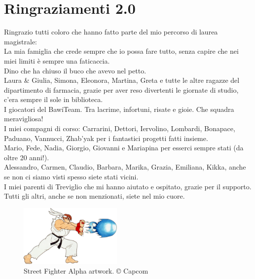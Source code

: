 %
%

\chapter*{Ringraziamenti 2.0}

Ringrazio tutti coloro che hanno fatto parte del mio percorso di laurea magistrale:\\
La mia famiglia che crede sempre che io possa fare tutto, senza capire che nei miei limiti è sempre una faticaccia.\\
Dino che ha chiuso il buco che avevo nel petto.\\
Laura \& Giulia, Simona, Eleonora, Martina, Greta e tutte le altre ragazze del dipartimento di farmacia, grazie per aver reso divertenti le giornate di studio, c'era sempre il sole in biblioteca.\\
I giocatori del BawiTeam. Tra lacrime, infortuni, risate e gioie. Che squadra meravigliosa!\\
I miei compagni di corso: Carrarini, Dettori, Iervolino, Lombardi, Bonapace, Paduano, Vannucci, Zhab'yak per i fantastici progetti fatti insieme.\\
Mario, Fede, Nadia, Giorgio, Giovanni e Mariapina per esserci sempre stati (da oltre 20 anni!).\\
Alessandro, Carmen, Claudio, Barbara, Marika, Grazia, Emiliana, Kikka, anche se non ci siamo visti spesso siete stati vicini.\\
I miei parenti di Treviglio che mi hanno aiutato e ospitato, grazie per il supporto.\\
Tutti gli altri, anche se non menzionati, siete nel mio cuore.

\vspace*{\fill}

\begin{figure}[H]
	\centering
	\includegraphics[width=5cm]{immagini/hadoken}
	\caption{Street Fighter Alpha artwork. © Capcom}
	\label{fig:hadoken}
\end{figure}